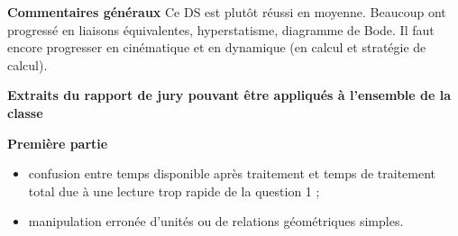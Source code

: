 \documentclass[10pt,fleqn]{article} %
\begin{document}

\pagestyle{fancy}
\thispagestyle{plain}


\def\columnseprulecolor{\color{ocre}}
\setlength{\columnseprule}{0.4pt} 



\vspace{6cm}


\textbf{Commentaires généraux}
Ce DS est plutôt réussi en moyenne. Beaucoup ont progressé en liaisons équivalentes, hyperstatisme, diagramme de Bode. Il faut encore progresser en cinématique et en dynamique (en calcul et stratégie de calcul).





 \textbf{Extraits du rapport de jury pouvant être appliqués à l'ensemble de la classe}

\textbf{Première partie}
\begin{itemize}
\item confusion entre temps disponible après traitement et temps de traitement total due à une lecture
trop rapide de la question 1 ;
\item manipulation erronée d’unités ou de relations géométriques simples.
\end{itemize}
\end{document}
